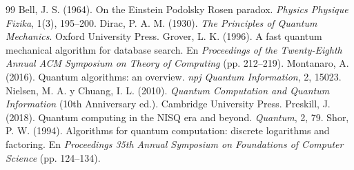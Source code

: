 \begin{thebibliography}{99}
 Bell, J. S. (1964). On the Einstein Podolsky Rosen paradox. \emph{Physics Physique Fizika}, 1(3), 195--200.
 Dirac, P. A. M. (1930). \emph{The Principles of Quantum Mechanics}. Oxford University Press.
 Grover, L. K. (1996). A fast quantum mechanical algorithm for database search. En \emph{Proceedings of the Twenty-Eighth Annual ACM Symposium on Theory of Computing} (pp. 212--219).
 Montanaro, A. (2016). Quantum algorithms: an overview. \emph{npj Quantum Information}, 2, 15023.
 Nielsen, M. A. y Chuang, I. L. (2010). \emph{Quantum Computation and Quantum Information} (10th Anniversary ed.). Cambridge University Press.
 Preskill, J. (2018). Quantum computing in the NISQ era and beyond. \emph{Quantum}, 2, 79.
 Shor, P. W. (1994). Algorithms for quantum computation: discrete logarithms and factoring. En \emph{Proceedings 35th Annual Symposium on Foundations of Computer Science} (pp. 124--134).
\end{thebibliography}
